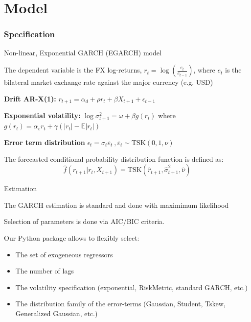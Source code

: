\documentclass{beamer}
\newenvironment{largeitemize}{\itemize\addtolength{\itemsep}{10pt}}{\enditemize}
\begin{document}
\section{Model}

\begin{frame}
  \frametitle{Specification}
\begin{largeitemize}  
\item Non-linear, Exponential GARCH (EGARCH) model 
\item The dependent variable is the FX log-returns, $r_t = \log(\frac{e_t}{e_{t-1}})$, where
$e_t$ is the bilateral market exchange rate against the major currency
(e.g. USD)
\item \textbf{Drift AR-X(1):} $r_{t+1} = \alpha_d +
  \rho r_t + \beta X_{t+1} + \epsilon_{t-1}$\\  
\item \textbf{Exponential volatility:} $\log \sigma_{t+1}^{2} = \omega + \beta
g(r_t)$ where $g(r_t) = \alpha_v r_t + \gamma(|r_t|-\mathbb{E}|r_t|)$

\item \textbf{Error term distribution} $\epsilon_t = \sigma_t \varepsilon_t
  \ , \varepsilon_t \sim \text{TSK}(0, 1,\nu)$\\
  
\item The forecasted conditional probability distribution function is defined as:
      \begin{equation*}
        \hat{f}(r_{t+1} | r_{t}, X_{t+1}) = \text{TSK}(\hat{r}_{t+1},
        \hat{\sigma}_{t+1}^{2}, \hat{\nu})
      \end{equation*}      
\end{largeitemize}
\end{frame}

\begin{frame}{Estimation}
\begin{largeitemize}
\item The GARCH estimation is standard and done with maximimum likelihood
 \item Selection of parameters is done via AIC/BIC criteria.    
  \item Our Python package allows to flexibly select:
    \begin{itemize}
    \item The set of exogeneous regressors
    \item The number of lags
    \item The volatility specification (exponential, RiskMetric, standard GARCH,
      etc.)
    \item The distribution family of the error-terms (Gaussian,
    Student, Tskew, Generalized Gaussian, etc.)  
      \end{itemize}    
\end{largeitemize}
\end{frame}
\end{document}
